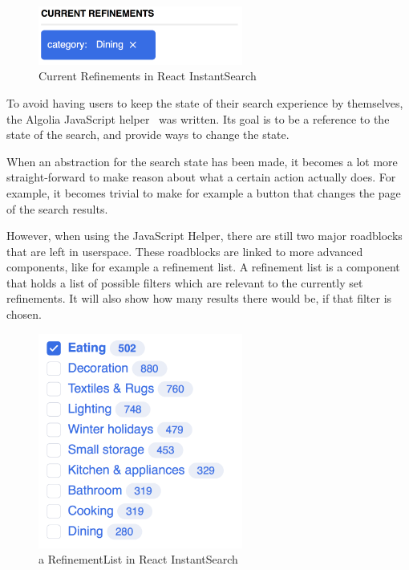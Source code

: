 \begin{figure}[H]
\label{figure:js-helper-state}
  \centering
  \includegraphics[width=0.6\textwidth]{../assets/current-refinements.png}
  \caption{Current Refinements in React InstantSearch\cite{ris-storybooks}}
\end{figure}

To avoid having users to keep the state of their search experience by themselves, the Algolia JavaScript helper~\cite{algolia-js-helper} was written. Its goal is to be a reference to the state of the search, and provide ways to change the state.

When an abstraction for the search state has been made, it becomes a lot more straight-forward to make reason about what a certain action actually does. For example, it becomes trivial to make for example a button that changes the page of the search results.

However, when using the JavaScript Helper, there are still two major roadblocks that are left in userspace. These roadblocks are linked to more advanced components, like for example a refinement list. A refinement list is a component that holds a list of possible filters which are relevant to the currently set refinements. It will also show how many results there would be, if that filter is chosen.

\begin{figure}[H]
\label{figure:js-helper-state}
  \centering
  \includegraphics[width=0.6\textwidth]{../assets/refinementlist.png}
  \caption{a RefinementList in React InstantSearch\cite{ris-storybooks}}
\end{figure}

